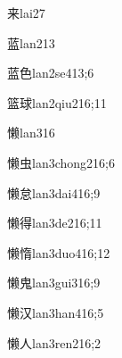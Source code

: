 \begin{verbete}{来}{lai2}{7}
\end{verbete}

\begin{verbete}{蓝}{lan2}{13}
\end{verbete}

\begin{verbete}{蓝色}{lan2se4}{13;6}
\end{verbete}

\begin{verbete}{篮球}{lan2qiu2}{16;11}
\end{verbete}

\begin{verbete}{懒}{lan3}{16}
\end{verbete}

\begin{verbete}{懒虫}{lan3chong2}{16;6}
\end{verbete}

\begin{verbete}{懒怠}{lan3dai4}{16;9}
\end{verbete}

\begin{verbete}{懒得}{lan3de2}{16;11}
\end{verbete}

\begin{verbete}{懒惰}{lan3duo4}{16;12}
\end{verbete}

\begin{verbete}{懒鬼}{lan3gui3}{16;9}
\end{verbete}

\begin{verbete}{懒汉}{lan3han4}{16;5}
\end{verbete}

\begin{verbete}{懒人}{lan3ren2}{16;2}
\end{verbete}

